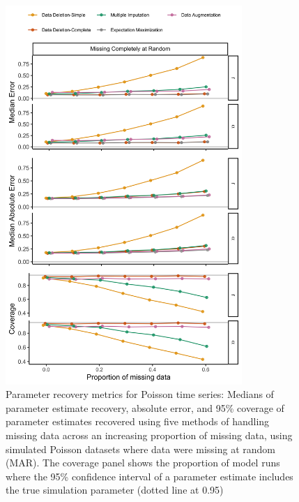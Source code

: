 \documentclass{article}
\begin{document}
\begin{figure}
    \centering
    \noindent\includegraphics[width = 0.8\textwidth]{Figures/MockedUpFigures/parameterRecoveryPoisson_MCARlong.png}
    \caption{Parameter recovery metrics for Poisson time series: Medians of parameter estimate recovery, absolute error, and 95\% coverage of parameter estimates recovered using five methods of handling missing data across an increasing proportion of missing data, using simulated Poisson datasets where data were missing at random (MAR). The coverage panel shows the proportion of model runs where the 95\% confidence interval of a parameter estimate includes the true simulation parameter (dotted line at 0.95)}
    \label{fig:ParamRec_Pois}
\end{figure}
\end{document}

